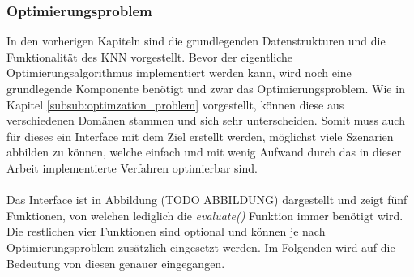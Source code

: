 \subsubsection{Optimierungsproblem}
In den vorherigen Kapiteln sind die grundlegenden Datenstrukturen und die Funktionalität des \ac{KNN} vorgestellt. Bevor der eigentliche Optimierungsalgorithmus implementiert werden kann, wird noch eine grundlegende Komponente benötigt und zwar das Optimierungsproblem. Wie in Kapitel \ref{subsub:optimzation_problem} vorgestellt, können diese aus verschiedenen Domänen stammen und sich sehr unterscheiden. Somit muss auch für dieses ein Interface mit dem Ziel erstellt werden, möglichst viele Szenarien abbilden zu können, welche einfach und mit wenig Aufwand durch das in dieser Arbeit implementierte Verfahren optimierbar sind.
\\\\
Das Interface ist in Abbildung (TODO ABBILDUNG) dargestellt und zeigt fünf Funktionen, von welchen lediglich die \emph{evaluate()} Funktion immer benötigt wird. Die restlichen vier Funktionen sind optional und können je nach Optimierungsproblem zusätzlich eingesetzt werden. Im Folgenden wird auf die Bedeutung von diesen genauer eingegangen.
\\\\
